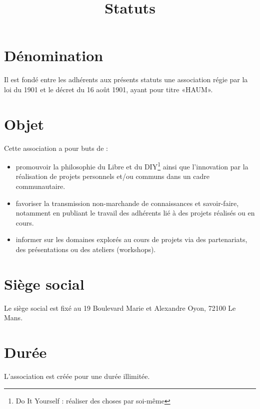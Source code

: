 \documentclass[a4paper, 11pt]{article}
\title{Statuts}
\author{}
\date{}
\newcommand{\nomHS}{HAUM}
\begin{document}
    \maketitle

\section{Dénomination} %

Il est fondé entre les adhérents aux présents statuts une association régie par la loi du 1901 et le décret du 16 août
1901, ayant pour titre «\nomHS».


\section{Objet} %

Cette association a pour buts de :

\begin{itemize}
    \item promouvoir la philosophie du Libre et du DIY\footnote{Do It Yourself : réaliser des choses par
        soi-même} ainsi que l'innovation par la réalisation de projets personnels et/ou communs dans un cadre
        communautaire.
    \item favoriser la transmission non-marchande de connaissances et savoir-faire, notamment en publiant le travail des
        adhérents lié à des projets réalisés ou en cours.
    \item informer sur les domaines explorés au cours de projets via des partenariats, des présentations ou des ateliers
        (workshops).
\end{itemize}


\section{Siège social} %

Le siège social est fixé au 19 Boulevard Marie et Alexandre Oyon, 72100 Le Mans.


\section{Durée} %

L'association est créée pour une durée illimitée.

\end{document}
